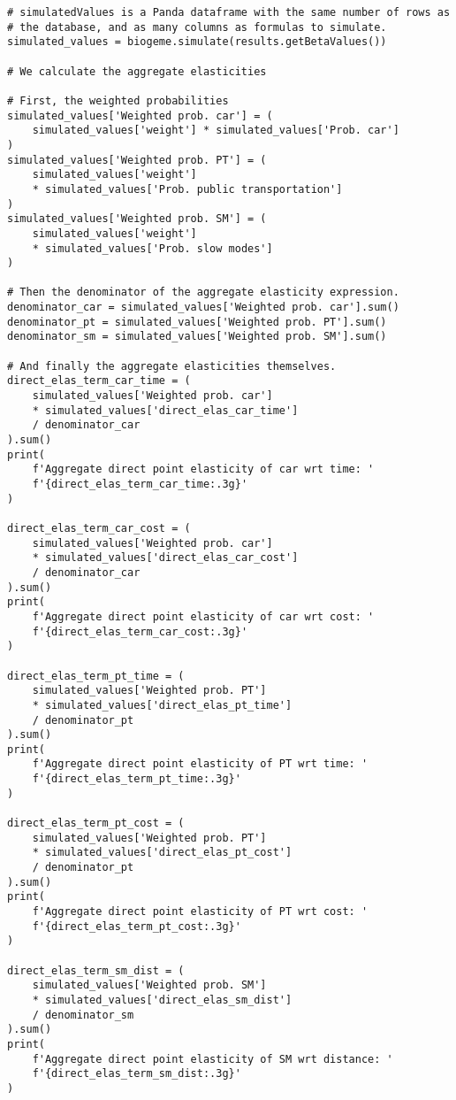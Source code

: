 \documentclass[12pt,a4paper]{article}
\begin{document}
\begin{lstlisting}[style=numbers]
# simulatedValues is a Panda dataframe with the same number of rows as
# the database, and as many columns as formulas to simulate.
simulated_values = biogeme.simulate(results.getBetaValues())

# We calculate the aggregate elasticities

# First, the weighted probabilities
simulated_values['Weighted prob. car'] = (
    simulated_values['weight'] * simulated_values['Prob. car']
)
simulated_values['Weighted prob. PT'] = (
    simulated_values['weight']
    * simulated_values['Prob. public transportation']
)
simulated_values['Weighted prob. SM'] = (
    simulated_values['weight']
    * simulated_values['Prob. slow modes']
)

# Then the denominator of the aggregate elasticity expression.
denominator_car = simulated_values['Weighted prob. car'].sum()
denominator_pt = simulated_values['Weighted prob. PT'].sum()
denominator_sm = simulated_values['Weighted prob. SM'].sum()

# And finally the aggregate elasticities themselves.
direct_elas_term_car_time = (
    simulated_values['Weighted prob. car']
    * simulated_values['direct_elas_car_time']
    / denominator_car
).sum()
print(
    f'Aggregate direct point elasticity of car wrt time: '
    f'{direct_elas_term_car_time:.3g}'
)

direct_elas_term_car_cost = (
    simulated_values['Weighted prob. car']
    * simulated_values['direct_elas_car_cost']
    / denominator_car
).sum()
print(
    f'Aggregate direct point elasticity of car wrt cost: '
    f'{direct_elas_term_car_cost:.3g}'
)

direct_elas_term_pt_time = (
    simulated_values['Weighted prob. PT']
    * simulated_values['direct_elas_pt_time']
    / denominator_pt
).sum()
print(
    f'Aggregate direct point elasticity of PT wrt time: '
    f'{direct_elas_term_pt_time:.3g}'
)

direct_elas_term_pt_cost = (
    simulated_values['Weighted prob. PT']
    * simulated_values['direct_elas_pt_cost']
    / denominator_pt
).sum()
print(
    f'Aggregate direct point elasticity of PT wrt cost: '
    f'{direct_elas_term_pt_cost:.3g}'
)

direct_elas_term_sm_dist = (
    simulated_values['Weighted prob. SM']
    * simulated_values['direct_elas_sm_dist']
    / denominator_sm
).sum()
print(
    f'Aggregate direct point elasticity of SM wrt distance: '
    f'{direct_elas_term_sm_dist:.3g}'
)
\end{lstlisting}
\end{document}
